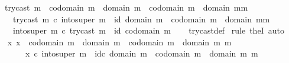 \begin{isabellebody}
\ \ \ {\isachardoublequoteopen}try{\isacharunderscore}{\kern0pt}cast\ m\ {\isacharcolon}{\kern0pt}\ codomain\ m\ {\isasymrightarrow}\ {\isacharparenleft}{\kern0pt}domain\ m{\isacharparenright}{\kern0pt}\ {\isasymCoprod}\ {\isacharparenleft}{\kern0pt}{\isacharparenleft}{\kern0pt}codomain\ m{\isacharparenright}{\kern0pt}\ {\isasymsetminus}\ {\isacharparenleft}{\kern0pt}{\isacharparenleft}{\kern0pt}domain\ m{\isacharparenright}{\kern0pt}{\isacharcomma}{\kern0pt}m{\isacharparenright}{\kern0pt}{\isacharparenright}{\kern0pt}\isanewline
\ \ \ \ {\isasymand}\ try{\isacharunderscore}{\kern0pt}cast\ m\ {\isasymcirc}\isactrlsub c\ into{\isacharunderscore}{\kern0pt}super\ m\ {\isacharequal}{\kern0pt}\ id\ {\isacharparenleft}{\kern0pt}{\isacharparenleft}{\kern0pt}domain\ m{\isacharparenright}{\kern0pt}\ {\isasymCoprod}\ {\isacharparenleft}{\kern0pt}{\isacharparenleft}{\kern0pt}codomain\ m{\isacharparenright}{\kern0pt}\ {\isasymsetminus}\ {\isacharparenleft}{\kern0pt}{\isacharparenleft}{\kern0pt}domain\ m{\isacharparenright}{\kern0pt}{\isacharcomma}{\kern0pt}m{\isacharparenright}{\kern0pt}{\isacharparenright}{\kern0pt}{\isacharparenright}{\kern0pt}\isanewline
\ \ \ \ {\isasymand}\ into{\isacharunderscore}{\kern0pt}super\ m\ {\isasymcirc}\isactrlsub c\ try{\isacharunderscore}{\kern0pt}cast\ m\ {\isacharequal}{\kern0pt}\ id\ {\isacharparenleft}{\kern0pt}codomain\ m{\isacharparenright}{\kern0pt}{\isachardoublequoteclose}\isanewline
%
\isadelimproof
\ \ %
\endisadelimproof
%
\isatagproof
{}\isamarkupfalse%
\ try{\isacharunderscore}{\kern0pt}cast{\isacharunderscore}{\kern0pt}def\isanewline
{}\isamarkupfalse%
\ {\isacharparenleft}{\kern0pt}rule\ theI{\isacharprime}{\kern0pt}{\isacharcomma}{\kern0pt}\ auto{\isacharparenright}{\kern0pt}\isanewline
\ \ \isamarkupfalse%
\ {\isachardoublequoteopen}{\isasymexists}x{\isachardot}{\kern0pt}\ x\ {\isacharcolon}{\kern0pt}\ codomain\ m\ {\isasymrightarrow}\ domain\ m\ {\isasymCoprod}\ {\isacharparenleft}{\kern0pt}codomain\ m\ {\isasymsetminus}\ {\isacharparenleft}{\kern0pt}domain\ m{\isacharcomma}{\kern0pt}\ m{\isacharparenright}{\kern0pt}{\isacharparenright}{\kern0pt}\ {\isasymand}\isanewline
\ \ \ \ \ \ \ \ x\ {\isasymcirc}\isactrlsub c\ into{\isacharunderscore}{\kern0pt}super\ m\ {\isacharequal}{\kern0pt}\ id\isactrlsub c\ {\isacharparenleft}{\kern0pt}domain\ m\ {\isasymCoprod}\ {\isacharparenleft}{\kern0pt}codomain\ m\ {\isasymsetminus}\ {\isacharparenleft}{\kern0pt}domain\ m{\isacharcomma}{\kern0pt}\ m{\isacharparenright}{\kern0pt}{\isacharparenright}{\kern0pt}{\isacharparenright}{\kern0pt}\ {\isasymand}\isanewline

\end{isabellebody}
